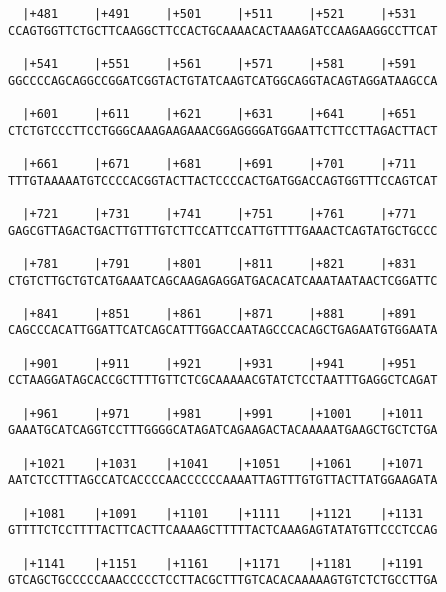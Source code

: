 \documentclass{article}
\begin{document}
\begin{Verbatim}
  |+481     |+491     |+501     |+511     |+521     |+531   
CCAGTGGTTCTGCTTCAAGGCTTCCACTGCAAAACACTAAAGATCCAAGAAGGCCTTCAT
                                                            
  |+541     |+551     |+561     |+571     |+581     |+591   
GGCCCCAGCAGGCCGGATCGGTACTGTATCAAGTCATGGCAGGTACAGTAGGATAAGCCA
                                                            
  |+601     |+611     |+621     |+631     |+641     |+651   
CTCTGTCCCTTCCTGGGCAAAGAAGAAACGGAGGGGATGGAATTCTTCCTTAGACTTACT
                                                            
  |+661     |+671     |+681     |+691     |+701     |+711   
TTTGTAAAAATGTCCCCACGGTACTTACTCCCCACTGATGGACCAGTGGTTTCCAGTCAT
                                                            
  |+721     |+731     |+741     |+751     |+761     |+771   
GAGCGTTAGACTGACTTGTTTGTCTTCCATTCCATTGTTTTGAAACTCAGTATGCTGCCC
                                                            
  |+781     |+791     |+801     |+811     |+821     |+831   
CTGTCTTGCTGTCATGAAATCAGCAAGAGAGGATGACACATCAAATAATAACTCGGATTC
                                                            
  |+841     |+851     |+861     |+871     |+881     |+891   
CAGCCCACATTGGATTCATCAGCATTTGGACCAATAGCCCACAGCTGAGAATGTGGAATA
                                                            
  |+901     |+911     |+921     |+931     |+941     |+951   
CCTAAGGATAGCACCGCTTTTGTTCTCGCAAAAACGTATCTCCTAATTTGAGGCTCAGAT
                                                            
  |+961     |+971     |+981     |+991     |+1001    |+1011  
GAAATGCATCAGGTCCTTTGGGGCATAGATCAGAAGACTACAAAAATGAAGCTGCTCTGA
                                                            
  |+1021    |+1031    |+1041    |+1051    |+1061    |+1071  
AATCTCCTTTAGCCATCACCCCAACCCCCCAAAATTAGTTTGTGTTACTTATGGAAGATA
                                                            
  |+1081    |+1091    |+1101    |+1111    |+1121    |+1131  
GTTTTCTCCTTTTACTTCACTTCAAAAGCTTTTTACTCAAAGAGTATATGTTCCCTCCAG
                                                            
  |+1141    |+1151    |+1161    |+1171    |+1181    |+1191  
GTCAGCTGCCCCCAAACCCCCTCCTTACGCTTTGTCACACAAAAAGTGTCTCTGCCTTGA
                                                            

\end{Verbatim}
\end{document}
